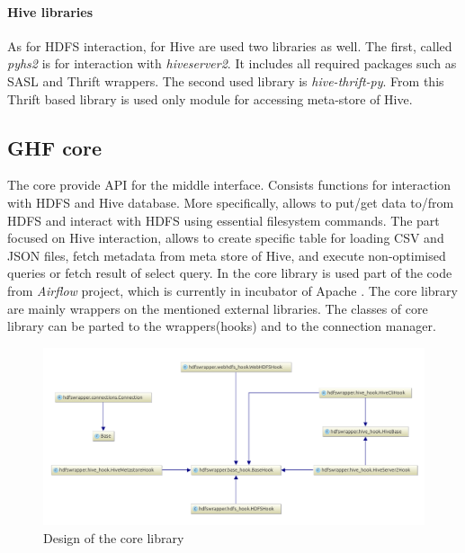 \documentclass[a4paper,12pt,oneside]{report}
\begin{document}
	\paragraph{Hive libraries}
	As for HDFS interaction, for Hive are used two libraries as well. The first,
	called \textit{pyhs2} is for interaction with \textit{hiveserver2}. It includes all
	required packages such as SASL and Thrift wrappers. The second used library is
	\textit{hive-thrift-py}. From this Thrift based library is used only module for
	accessing meta-store of Hive.
	
	\subsection{GHF core}
	The core provide API for the middle interface. Consists functions for
	interaction with HDFS and Hive database. More specifically, allows to put/get
	data to/from HDFS and interact with HDFS using essential filesystem commands.
	The part focused on Hive interaction, allows to create specific table for
	loading CSV and JSON files, fetch metadata from meta store of Hive, and execute
	non-optimised queries or fetch result of select query. In the core library is
	used part of the code from \textit{Airflow} project, which is currently in
	incubator of Apache \cite{airflow_diff}. The core library are mainly wrappers on
	the mentioned external libraries. The classes of core library can be parted to
	the  wrappers(hooks) and to the connection manager. 
	
	\begin{figure}[!htbp]
		\centering
		\includegraphics[width=1\textwidth]{./img/diag1_small.pdf}
		\caption[Core diagram]{\centering Design of the core library }
	\end{figure} 
	
\end{document}
